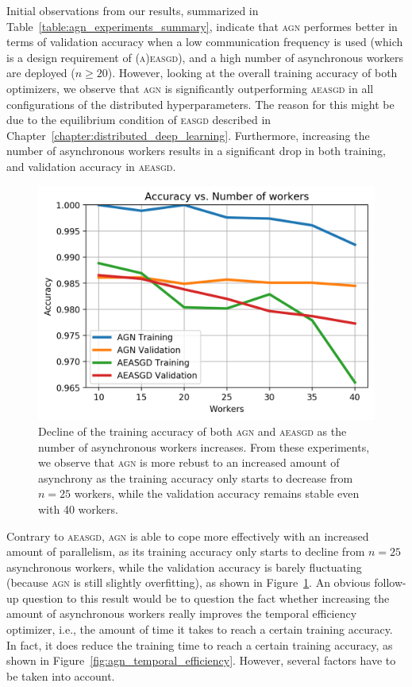 Initial observations from our results, summarized in Table~\ref{table:agn_experiments_summary}, indicate that \textsc{agn} performes better in terms of validation accuracy when a low communication frequency is used (which is a design requirement of \textsc{(a)easgd}), and a high number of asynchronous workers are deployed ($n \geq 20$). However, looking at the overall training accuracy of both optimizers, we observe that \textsc{agn} is significantly outperforming \textsc{aeasgd} in all configurations of the distributed hyperparameters. The reason for this might be due to the equilibrium condition of \textsc{easgd} described in Chapter~\ref{chapter:distributed_deep_learning}. Furthermore, increasing the number of asynchronous workers results in a significant drop in both training, and validation accuracy in \textsc{aeasgd}.

\begin{figure}[H]
  \centering
  \includegraphics[width=.5\textwidth]{resources/images/agn_aeasgd_workers}
  \caption{Decline of the training accuracy of both \textsc{agn} and \textsc{aeasgd} as the number of asynchronous workers increases. From these experiments, we observe that \textsc{agn} is more rebust to an increased amount of asynchrony as the training accuracy only starts to decrease from $n = 25$ workers, while the validation accuracy remains stable even with 40 workers.}
  \label{fig:agn_aeasgd_workers_performance_decline}
\end{figure}

Contrary to \textsc{aeasgd}, \textsc{agn} is able to cope more effectively with an increased amount of parallelism, as its training accuracy only starts to decline from $n = 25$ asynchronous workers, while the validation accuracy is barely fluctuating (because \textsc{agn} is still slightly overfitting), as shown in Figure~\ref{fig:agn_aeasgd_workers_performance_decline}. An obvious follow-up question to this result would be to question the fact whether increasing the amount of asynchronous workers really improves the temporal efficiency optimizer, i.e., the amount of time it takes to reach a certain training accuracy. In fact, it does reduce the training time to reach a certain training accuracy, as shown in Figure~\ref{fig:agn_temporal_efficiency}. However, several factors have to be taken into account.


